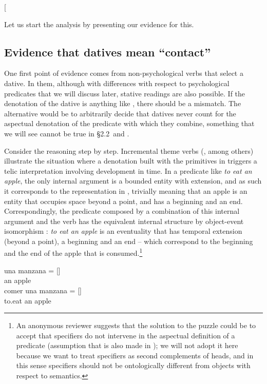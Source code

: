 \documentclass[output=paper,colorlinks,citecolor=brown,nonflat]{./langscibook}
\begin{document}
\ea%
    \label{ex:fabregas:17}{}
    [
    \z

Let us start the analysis by presenting our evidence for this. 

\subsection{Evidence that datives mean ``contact''}\label{sec:fabregas:2.1}

One first point of evidence comes from non-psychological verbs that select a dative. In them, although with differences with respect to psychological predicates that we will discuss later, stative readings are also possible. If the denotation of the dative is anything like , there should be a mismatch. The alternative would be to arbitrarily decide that datives never count for the aspectual denotation of the predicate with which they combine, something that we will see cannot be true in §2.2~and .

Consider the reasoning step by step. Incremental theme verbs (\citealt{Tenny1987, Krifka1989}, among others) illustrate the situation where a denotation built with the primitives in  triggers a telic interpretation involving development in time. In a predicate like \textit{to eat an apple}, the only internal argument is a bounded entity with extension, and as such it corresponds to the representation in , trivially meaning that an apple is an entity that occupies space beyond a point, and has a beginning and an end. Correspondingly, the predicate  composed by a combination of this internal argument and the verb has the equivalent internal structure by object-event isomorphism \citep{Ramchand2008}: \textit{to eat an apple} is an eventuality that has temporal extension (beyond a point), a beginning and an end – which correspond to the beginning and the end of the apple that is consumed.\footnote{An anonymous reviewer suggests that the solution to the puzzle could be to accept that specifiers do not intervene in the aspectual definition of a predicate (assumption that is also made in \citet{Ramchand2008}); we will not adopt it here because we want to treat specifiers as second complements of heads, and in this sense specifiers should not be ontologically different from objects with respect to semantics.} 

\ea%
    \label{ex:fabregas:18}
    \ea\label{ex:fabregas:18a}
    \gll    una manzana       =       [{\midline}]\\
            {an}   {apple}\\
    \ex\label{ex:fabregas:18b}
    \gll    comer una manzana  =      [{\midline}]\\
            {to.eat}  {an}   {apple}\\
    \z
\z
\end{document}
